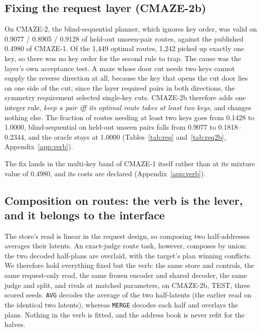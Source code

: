 \documentclass{article} %
\begin{document}
\subsection{Fixing the request layer (CMAZE-2b)}
\label{sec:req-layer}

On CMAZE-2, the blind-sequential planner, which ignores key order, was valid on 0.9077 /
0.8905 / 0.9128 of held-out unseen-pair routes, against the published 0.4980 of CMAZE-1. Of
the 1,449 optimal routes, 1,242 picked up exactly one key, so there was no key order for the
second rule to trap. %
The cause was the layer's own acceptance test. A maze whose door cut needs two keys cannot
supply the reverse direction at all, because the key that opens the cut door lies on one side
of the cut; since the layer required pairs in both directions, the symmetry requirement selected
single-key cuts. %
CMAZE-2b therefore adds one integer rule, \emph{keep a pair iff its optimal route takes at least
two keys}, and changes nothing else. The fraction of routes needing at least two keys goes from
0.1428 to 1.0000, blind-sequential on held-out unseen pairs falls from 0.9077 to 0.1818--0.2344,
and the oracle stays at 1.0000 (Tables~\ref{tab:req} and~\ref{tab:req2b}, Appendix~\ref{app:verb}). %

The fix lands in the multi-key band of CMAZE-1 itself rather than at its mixture value of 0.4980, and %
its costs are declared (Appendix~\ref{app:verb}).

\subsection{Composition on routes: the verb is the lever, and it belongs to the interface}
\label{sec:verb}

The store's read is linear in the request design, so composing two half-addresses averages
their latents. An exact-judge route task, however, composes by union: the two decoded half-plans
are overlaid, with the target's plan winning conflicts. We therefore hold everything fixed but
the verb: the same store and controls, the same request-only read, the same frozen encoder and
shared decoder, the same judge and split, and rivals at matched parameters, on CMAZE-2b, TEST,
three scored seeds. \texttt{AVG} decodes the average of the two half-latents (the earlier read
on the identical two latents), whereas \texttt{MERGE} decodes each half and overlays the plans.
Nothing in the verb is fitted, and the address book is never refit for the halves. %
\end{document}
